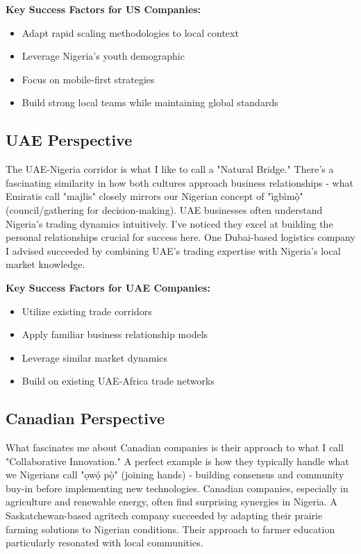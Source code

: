 \textbf{Key Success Factors for US Companies:}
\begin{itemize}
    \item Adapt rapid scaling methodologies to local context
    \item Leverage Nigeria's youth demographic
    \item Focus on mobile-first strategies
    \item Build strong local teams while maintaining global standards
\end{itemize}

\subsection{UAE Perspective}


The UAE-Nigeria corridor is what I like to call a "Natural Bridge." There's a fascinating similarity in how both cultures approach business relationships - what Emiratis call "majlis" closely mirrors our Nigerian concept of "ìgbìmọ̀" (council/gathering for decision-making).
UAE businesses often understand Nigeria's trading dynamics intuitively. I've noticed they excel at building the personal relationships crucial for success here. One Dubai-based logistics company I advised succeeded by combining UAE's trading expertise with Nigeria's local market knowledge.

\textbf{Key Success Factors for UAE Companies:}
\begin{itemize}
    \item Utilize existing trade corridors
    \item Apply familiar business relationship models
    \item Leverage similar market dynamics
    \item Build on existing UAE-Africa trade networks
\end{itemize}

\subsection{Canadian Perspective}


What fascinates me about Canadian companies is their approach to what I call "Collaborative Innovation." A perfect example is how they typically handle what we Nigerians call "ọwọ́ pọ̀" (joining hands) - building consensus and community buy-in before implementing new technologies.
Canadian companies, especially in agriculture and renewable energy, often find surprising synergies in Nigeria. A Saskatchewan-based agritech company succeeded by adapting their prairie farming solutions to Nigerian conditions. Their approach to farmer education particularly resonated with local communities.

